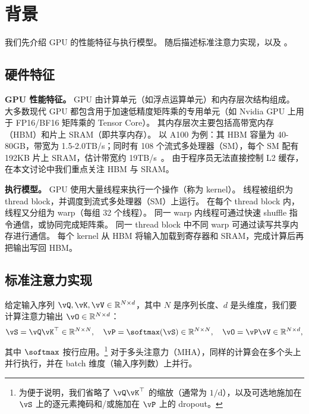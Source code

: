 \section{背景}
\label{sec:background}

我们先介绍 GPU 的性能特征与执行模型。
随后描述标准注意力实现，以及 \sysnameone。

\subsection{硬件特征}
\label{subsec:hardware}

\textbf{GPU 性能特征。}
GPU 由计算单元（如浮点运算单元）和内存层次结构组成。
大多数现代 GPU 都包含用于加速低精度矩阵乘的专用单元（如 Nvidia GPU 上用于 FP16/BF16 矩阵乘的 Tensor Core）。
其内存层次主要包括高带宽内存（HBM）和片上 SRAM（即共享内存）。
以 A100 为例：其 HBM 容量为 40-80GB，带宽为 1.5-2.0TB/s；同时有 108 个流式多处理器（SM），每个 SM 配有 192KB 片上 SRAM，估计带宽约 19TB/s~\citep{jia2018dissecting,
  jia2021dissecting}。
由于程序员无法直接控制 L2 缓存，在本文讨论中我们重点关注 HBM 与 SRAM。

\textbf{执行模型。}
GPU 使用大量线程来执行一个操作（称为 kernel）。
线程被组织为 thread block，并调度到流式多处理器（SM）上运行。
在每个 thread block 内，线程又分组为 warp（每组 32 个线程）。
同一 warp 内线程可通过快速 shuffle 指令通信，或协同完成矩阵乘。
同一 thread block 中不同 warp 可通过读写共享内存进行通信。
每个 kernel 从 HBM 将输入加载到寄存器和 SRAM，完成计算后再把输出写回 HBM。

\subsection{标准注意力实现}
\label{subsec:standard_attn}

给定输入序列 $\vQ, \vK, \vV \in \mathbb{R}^{N \times d}$，其中 $N$ 是序列长度、$d$ 是头维度，我们要计算注意力输出 $\vO \in \mathbb{R}^{N \times d}$：
\begin{equation*}
  \vS = \vQ \vK^\top \in \mathbb{R}^{N \times N}, \quad \vP = \softmax(\vS) \in \mathbb{R}^{N \times N}, \quad \vO = \vP\vV \in \mathbb{R}^{N \times d},
\end{equation*}
其中 $\softmax$ 按行应用。\footnote{为便于说明，我们省略了 $\vQ\vK^\top$ 的缩放（通常为 $1/\mathrm{d}$），以及可选地施加在 $\vS$ 上的逐元素掩码和/或施加在 $\vP$ 上的 dropout。}
对于多头注意力（MHA），同样的计算会在多个头上并行执行，并在 batch 维度（输入序列数）上并行。

